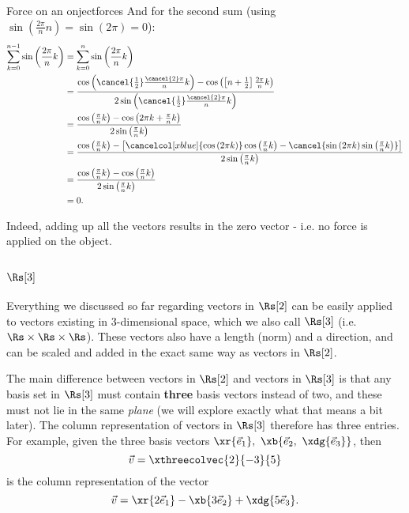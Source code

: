 \begin{example}{Force on an onject}{forces}
  And for the second sum (using $\sin\left(\frac{2\pi}{n}n\right)=\sin\left(2\pi\right)=0$):
  \begin{align*}
    \sum\limits_{k=0}^{n-1}\sin\left( \frac{2\pi}{n}k \right) &= \sum\limits_{k=0}^{n}\sin\left( \frac{2\pi}{n}k \right)\\
                                                              &= \frac{\cos\left(\cancel{\frac{1}{2}}\frac{\cancel{2}\pi}{n}k\right)-\cos\left(\left[n+\frac{1}{2}\right]\frac{2\pi}{n}k\right)}{2\sin\left(\cancel{\frac{1}{2}}\frac{\cancel{2}\pi}{n}k\right)}\\
                                                              &= \frac{\cos\left(\frac{\pi}{n}k\right)-\cos\left(2\pi k+\frac{\pi}{n}k\right)}{2\sin\left(\frac{\pi}{n}k\right)}\\
                                                              &= \frac{\cos\left(\frac{\pi}{n}k\right)-\left[\cancelcol[xblue]{\cos\left(2\pi k\right)}\cos\left(\frac{\pi}{n}k\right)-\cancel{\sin\left(2\pi k\right)\sin\left(\frac{\pi}{n}k\right)}\right]}{2\sin\left(\frac{\pi}{n}k\right)}\\
                                                              &= \frac{\cos\left(\frac{\pi}{n}k\right)-\cos\left(\frac{\pi}{n}k\right)}{2\sin\left(\frac{\pi}{n}k\right)}\\
                                                              &= 0.
  \end{align*}


  Indeed, adding up all the vectors results in the zero vector - i.e. no force is applied on the object.
\end{example}

\subsection{$\Rs[3]$}
Everything we discussed so far regarding vectors in $\Rs[2]$ can be easily applied to vectors existing in 3-dimensional space, which we also call $\Rs[3]$ (i.e. $\Rs\times\Rs\times\Rs$). These vectors also have a length (norm) and a direction, and can be scaled and added in the exact same way as vectors in $\Rs[2]$.

The main difference between vectors in $\Rs[2]$ and vectors in $\Rs[3]$ is that any basis set in $\Rs[3]$ must contain \textbf{three} basis vectors instead of two, and these must not lie in the same \textit{plane} (we will explore exactly what that means a bit later). The column representation of vectors in $\Rs[3]$ therefore has three entries. For example, given the three basis vectors $\xr{\vec{e}_{1}},\ \xb{\vec{e}_{2},\ \xdg{\vec{e}_{3}}}$, then
\[
  \vec{v} = \xthreecolvec{2}{-3}{5}
\]
is the column representation of the vector
\[
  \vec{v} = \xr{2\vec{e}_{1}} - \xb{3\vec{e}_{2}} + \xdg{5\vec{e}_{3}}.
\]

